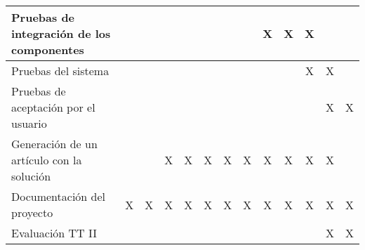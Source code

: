 \begin{longtable}{|p{2.5cm}|c|c|c|c|c|c|c|c|c|c|c|c|}
	Pruebas de integración de los componentes &  &  &  &  &  &  &  & X & X & X & & \\ \hline
	Pruebas del sistema &  &  &  &  &  &  &  &  &  & X & X & \\ \hline
	Pruebas de aceptación por el usuario &  &  &  &  &  &  &  &  &  &  & X & X \\ \hline
	Generación de un artículo con la solución &  &  & X & X & X & X & X & X & X & X & X & \\ \hline
	Documentación del proyecto & X & X & X & X & X & X & X & X & X & X & X & X \\ \hline
	Evaluación TT II &  &  &  &  &  &  &  &  &  &  & X & X\\ \hline
\end{longtable}